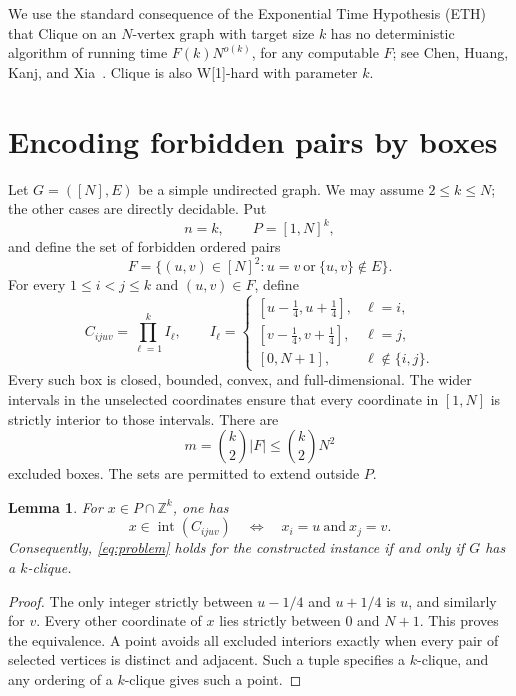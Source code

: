 \documentclass[11pt]{article}
\newtheorem{lemma}[theorem]{Lemma}
\newcommand{\Z}{\mathbb Z}
\DeclareMathOperator{\intr}{int}
\begin{document}
We use the standard consequence of the Exponential Time Hypothesis (ETH) that Clique on an $N$-vertex graph with target size $k$ has no deterministic algorithm of running time $F(k)N^{o(k)}$, for any computable $F$; see Chen, Huang, Kanj, and Xia~\cite{CHKX}. Clique is also W[1]-hard with parameter $k$.

\section{Encoding forbidden pairs by boxes}
Let $G=([N],E)$ be a simple undirected graph. We may assume $2\le k\le N$; the other cases are directly decidable. Put
\[
n=k,\qquad P=[1,N]^k,
\]
and define the set of forbidden ordered pairs
\[
F=\{(u,v)\in[N]^2:u=v\ \text{or}\ \{u,v\}\notin E\}.
\]
For every $1\le i<j\le k$ and $(u,v)\in F$, define
\begin{equation}\label{eq:box}
C_{ijuv}=\prod_{\ell=1}^k I_\ell,
\qquad
I_\ell=
\begin{cases}
[u-\tfrac14,u+\tfrac14],&\ell=i,\\
[v-\tfrac14,v+\tfrac14],&\ell=j,\\
[0,N+1],&\ell\notin\{i,j\}.
\end{cases}
\end{equation}
Every such box is closed, bounded, convex, and full-dimensional. The wider intervals in the unselected coordinates ensure that every coordinate in $[1,N]$ is strictly interior to those intervals. There are
\[
m=\binom{k}{2}|F|\le\binom{k}{2}N^2
\]
excluded boxes. The sets are permitted to extend outside $P$.

\begin{lemma}\label{lem:encoding}
For $x\in P\cap\Z^k$, one has
\[
x\in\intr(C_{ijuv})\quad\Longleftrightarrow\quad x_i=u\ \text{and}\ x_j=v.
\]
Consequently, \eqref{eq:problem} holds for the constructed instance if and only if $G$ has a $k$-clique.
\end{lemma}
\begin{proof}
The only integer strictly between $u-1/4$ and $u+1/4$ is $u$, and similarly for $v$. Every other coordinate of $x$ lies strictly between $0$ and $N+1$. This proves the equivalence. A point avoids all excluded interiors exactly when every pair of selected vertices is distinct and adjacent. Such a tuple specifies a $k$-clique, and any ordering of a $k$-clique gives such a point.
\end{proof}
\end{document}
